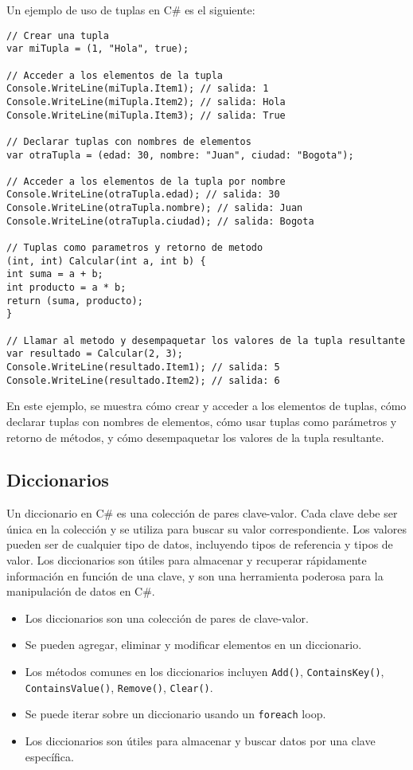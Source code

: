 \documentclass[executivepaper]{article}
\begin{document}
Un ejemplo de uso de tuplas en C\# es el siguiente:

\begin{lstlisting}
// Crear una tupla
var miTupla = (1, "Hola", true);

// Acceder a los elementos de la tupla
Console.WriteLine(miTupla.Item1); // salida: 1
Console.WriteLine(miTupla.Item2); // salida: Hola
Console.WriteLine(miTupla.Item3); // salida: True

// Declarar tuplas con nombres de elementos
var otraTupla = (edad: 30, nombre: "Juan", ciudad: "Bogota");

// Acceder a los elementos de la tupla por nombre
Console.WriteLine(otraTupla.edad); // salida: 30
Console.WriteLine(otraTupla.nombre); // salida: Juan
Console.WriteLine(otraTupla.ciudad); // salida: Bogota

// Tuplas como parametros y retorno de metodo
(int, int) Calcular(int a, int b) {
int suma = a + b;
int producto = a * b;
return (suma, producto);
}

// Llamar al metodo y desempaquetar los valores de la tupla resultante
var resultado = Calcular(2, 3);
Console.WriteLine(resultado.Item1); // salida: 5
Console.WriteLine(resultado.Item2); // salida: 6
\end{lstlisting}

En este ejemplo, se muestra cómo crear y acceder a los elementos de tuplas, cómo declarar tuplas con nombres de elementos, cómo usar tuplas como parámetros y retorno de métodos, y cómo desempaquetar los valores de la tupla resultante.

\subsection{Diccionarios}

Un diccionario en C\# es una colección de pares clave-valor. Cada clave debe ser única en la colección y se utiliza para buscar su valor correspondiente. Los valores pueden ser de cualquier tipo de datos, incluyendo tipos de referencia y tipos de valor. Los diccionarios son útiles para almacenar y recuperar rápidamente información en función de una clave, y son una herramienta poderosa para la manipulación de datos en C\#.
\begin{itemize}
    \item Los diccionarios son una colección de pares de clave-valor.
    \item Se pueden agregar, eliminar y modificar elementos en un diccionario.
    \item Los métodos comunes en los diccionarios incluyen \texttt{Add()}, \texttt{ContainsKey()}, \texttt{ContainsValue()}, \texttt{Remove()}, \texttt{Clear()}.
    \item Se puede iterar sobre un diccionario usando un \texttt{foreach} loop.
    \item Los diccionarios son útiles para almacenar y buscar datos por una clave específica.
\end{itemize}
\end{document}
